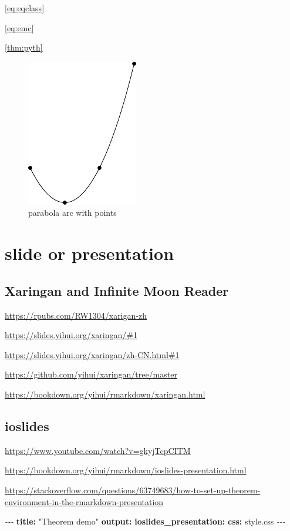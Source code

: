\documentclass[
]{book}
\newenvironment{Shaded}{\begin{snugshade}}{\end{snugshade}}
\newcommand{\AttributeTok}[1]{\textcolor[rgb]{0.13,0.29,0.53}{#1}}
\newcommand{\FunctionTok}[1]{\textcolor[rgb]{0.13,0.29,0.53}{\textbf{#1}}}
\newcommand{\KeywordTok}[1]{\textcolor[rgb]{0.13,0.29,0.53}{\textbf{#1}}}
\newcommand{\PreprocessorTok}[1]{\textcolor[rgb]{0.56,0.35,0.01}{\textit{#1}}}
\newcommand{\StringTok}[1]{\textcolor[rgb]{0.31,0.60,0.02}{#1}}
\theoremstyle{definition}
\theoremstyle{definition}
\theoremstyle{definition}
\theoremstyle{definition}
\theoremstyle{remark}
\begin{document}
\eqref{eq:eqclass}

\eqref{eq:emc}

\ref{thm:pyth}

\begin{figure}
\includegraphics[width=0.25\linewidth]{202401280001-test_files/figure-latex/parabola-arc-with-points-1} \caption{parabola arc with points}\label{fig:parabola-arc-with-points}
\end{figure}

\section{slide or presentation}\label{slide-or-presentation}

\subsection{Xaringan and Infinite Moon Reader}\label{xaringan-and-infinite-moon-reader}

\url{https://rpubs.com/RW1304/xarigan-zh}

\url{https://slides.yihui.org/xaringan/\#1}

\url{https://slides.yihui.org/xaringan/zh-CN.html\#1}

\url{https://github.com/yihui/xaringan/tree/master}

\url{https://bookdown.org/yihui/rmarkdown/xaringan.html}

\subsection{ioslides}\label{ioslides}

\url{https://www.youtube.com/watch?v=gkyjTcpCITM}

\url{https://bookdown.org/yihui/rmarkdown/ioslides-presentation.html}

\url{https://stackoverflow.com/questions/63749683/how-to-set-up-theorem-environment-in-the-rmarkdown-presentation}

\begin{Shaded}
\begin{Highlighting}[]
\PreprocessorTok{{-}{-}{-}}
\FunctionTok{title}\KeywordTok{:}\AttributeTok{ }\StringTok{"Theorem demo"}
\FunctionTok{output}\KeywordTok{:}
\AttributeTok{  }\FunctionTok{ioslides\_presentation}\KeywordTok{:}
\AttributeTok{    }\FunctionTok{css}\KeywordTok{:}\AttributeTok{ style.css}
\PreprocessorTok{{-}{-}{-}}
\end{Highlighting}
\end{Shaded}
\end{document}
